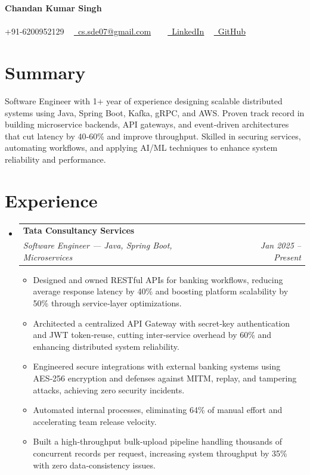 \documentclass[10pt, letterpaper]{article}
\makeatletter
\newcommand{\resumeItem}[1]{
  \item\small{
    {#1 \vspace{-2pt}}
  }
}
\newcommand{\resumeSubheading}[4]{
  \vspace{-2pt}\item
    \begin{tabular*}{1.0\textwidth}[t]{l@{\extracolsep{\fill}}r}
      \textbf{#1} & \textbf{\small #2} \\
      \textit{\small#3} & \textit{\small #4} \\
    \end{tabular*}\vspace{-7pt}
}
\newcommand{\resumeSubHeadingListStart}{\begin{itemize}[leftmargin=0.0in, label={}]}
\newcommand{\resumeSubHeadingListEnd}{\end{itemize}}
\newcommand{\resumeItemListStart}{\begin{itemize}[leftmargin=0.15in]}
\newcommand{\resumeItemListEnd}{\end{itemize}\vspace{-5pt}}
\makeatother
\begin{document}
\begin{center}
    {\Huge \bfseries Chandan Kumar Singh} \\ \vspace{5pt}
    ~ \\ \vspace{5pt}
    \small \faPhone* +91-6200952129 ~ 
    \href{mailto:cs.sde07@gmail.com}{\faEnvelope~cs.sde07@gmail.com} ~ 
     ~ \href{LinkedIn}{\faLinkedin~LinkedIn}
     ~ \href{GitHub}{\faGithub~GitHub}
    
\end{center}

\section{Summary}
Software Engineer with 1+ year of experience designing scalable distributed systems using Java, Spring Boot, Kafka, gRPC, and AWS. Proven track record in building microservice backends, API gateways, and event‑driven architectures that cut latency by 40‑60\% and improve throughput. Skilled in securing services, automating workflows, and applying AI/ML techniques to enhance system reliability and performance.


\section{Experience}
\resumeSubHeadingListStart
  \resumeSubheading{Tata Consultancy Services}{}{Software Engineer — Java, Spring Boot, Microservices}{Jan 2025 -- Present}
    \resumeItemListStart
      \resumeItem{Designed and owned RESTful APIs for banking workflows, reducing average response latency by 40\% and boosting platform scalability by 50\% through service‑layer optimizations.}
      \resumeItem{Architected a centralized API Gateway with secret‑key authentication and JWT token‑reuse, cutting inter‑service overhead by 60\% and enhancing distributed system reliability.}
      \resumeItem{Engineered secure integrations with external banking systems using AES‑256 encryption and defenses against MITM, replay, and tampering attacks, achieving zero security incidents.}
      \resumeItem{Automated internal processes, eliminating 64\% of manual effort and accelerating team release velocity.}
      \resumeItem{Built a high‑throughput bulk‑upload pipeline handling thousands of concurrent records per request, increasing system throughput by 35\% with zero data‑consistency issues.}
    \resumeItemListEnd
\resumeSubHeadingListEnd
\end{document}
